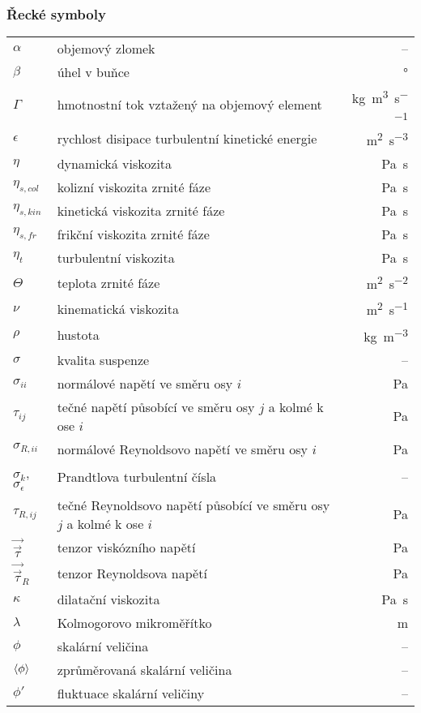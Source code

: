 \subsubsection*{Řecké symboly}
\begin{tabularx}{\textwidth}{@{}p{2.5cm} X r@{}}

$\alpha$ & objemový zlomek & --\\
$\beta$ & úhel v buňce & \si{\degree}\\
$\Gamma$ & hmotnostní tok vztažený na objemový element & \si{\kilogram\per\cubic\meter\per\second} \\ 
$\epsilon$ & rychlost disipace turbulentní kinetické energie & \si{\meter\squared\per\second\cubed}\\
$\eta$ & dynamická viskozita & \si{\pascal\second}\\
$\eta_{s,col}$ & kolizní viskozita zrnité fáze & \si{\pascal\second}\\
$\eta_{s,kin}$ & kinetická viskozita zrnité fáze & \si{\pascal\second}\\
$\eta_{s,fr}$ & frikční viskozita zrnité fáze & \si{\pascal\second}\\
$\eta_{t}$ & turbulentní viskozita & \si{\pascal\second}\\
$\Theta$ & teplota zrnité fáze & \si{\meter\squared\per\second\squared} \\
$\nu$ & kinematická viskozita & \si{\meter\squared\per\second}\\
$\rho$ & hustota & \si{\kilogram\per\cubic\meter} \\
$\sigma$ & kvalita suspenze & -- \\
$\sigma_{ii}$ & normálové napětí ve směru osy $i$ & \si{\pascal} \\
$\tau_{ij}$ & tečné napětí působící ve směru osy $j$ a kolmé k ose $i$ & \si{\pascal} \\
$\sigma_{R,ii}$ & normálové Reynoldsovo napětí ve směru osy $i$ & \si{\pascal} \\
$\sigma_{k}$, $\sigma_{\epsilon}$ & Prandtlova turbulentní čísla & -- \\
$\tau_{R,ij}$ & tečné Reynoldsovo napětí působící ve směru osy $j$ a kolmé k ose $i$ & \si{\pascal} \\
$\vec{\vec{\tau}}$ & tenzor viskózního napětí & \si{\pascal} \\
$\vec{\vec{\tau}}_{R}$ & tenzor Reynoldsova napětí & \si{\pascal} \\
$\kappa$ & dilatační viskozita & \si{\pascal\second}\\
$\lambda$ & Kolmogorovo mikroměřítko & \si{\meter}\\
$\phi$ & skalární veličina & --\\
$\left< \phi \right>$ & zprůměrovaná skalární veličina & --\\
$\phi'$ & fluktuace skalární veličiny & --\\

\end{tabularx}

